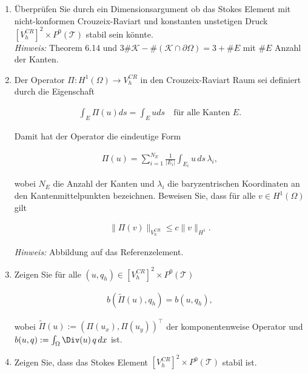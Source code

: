 
\begin{exercise}

\phantom{}

\begin{enumerate}[label = \textbf{\alph*)}]
  \item Überprüfen Sie durch ein Dimensionsargument ob das Stokes Element mit
  nicht-konformen Crouzeix-Raviart und konstanten unstetigen Druck
  $[V_h^{CR}]^2 \times P^0(\mathcal{T})$ stabil sein könnte. \\
  \textit{Hinweis:} Theorem 6.14 und
  $3\#\mathcal{K} - \#(\mathcal{K}\cap \partial\Omega) = 3 + \# E$ mit $\# E$
  Anzahl der Kanten.
  \item Der Operator $\Pi: H^1(\Omega) \to V_h^{CR}$ in den Crouzeix-Raviart Raum
  sei definiert durch die Eigenschaft

  \begin{align}
    \int_E \Pi(u) ds = \int_E u ds \quad \text{für alle Kanten } E.
  \end{align}

  Damit hat der Operator die eindeutige Form

  \begin{align}
    \Pi(u) = \sum_{i=1}^{N_E} \frac{1}{|E_i|}\int_{E_i} u\, ds\, \lambda_i,
  \end{align}

  wobei $N_E$ die Anzahl der Kanten und $\lambda_i$ die baryzentrischen Koordinaten
  an den Kantenmittelpunkten bezeichnen. Beweisen Sie, dass für alle $v \in H^1(\Omega)$ gilt

  \begin{align}
    \|\Pi(v)\|_{V_h^{CR}} \leq c\|v\|_{H^1}.
  \end{align}

    \textit{Hinweis:} Abbildung auf das Referenzelement.

    \item Zeigen Sie für alle $(u,q_h) \in [V_h^{CR}]^2 \times P^0(\mathcal{T})$

    \begin{align}
      b(\tilde{\Pi}(u),q_h) = b(u,q_h),
    \end{align}

    wobei $\tilde{\Pi}(u) := (\Pi(u_x),\Pi(u_y))^\top$ der komponentenweise
    Operator und $b(u,q) := \int_\Omega \Div(u)\, q\, dx$ ist.

    \item Zeigen Sie, dass das Stokes Element $[V_h^{CR}]^2 \times P^0(\mathcal{T})$ stabil ist.

\end{enumerate}

\end{exercise}


\begin{solution}

\phantom{}


\end{solution}


